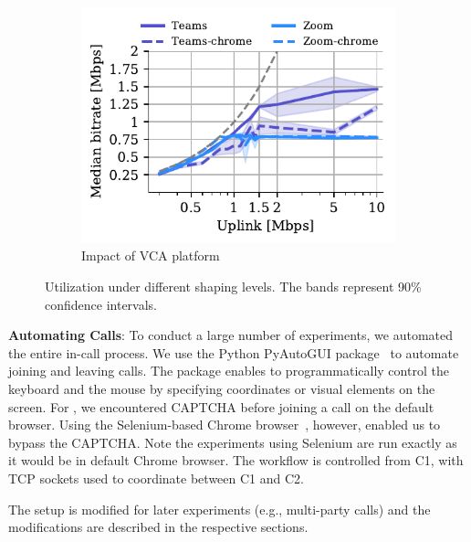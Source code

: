 \begin{figure}[ht!]
\begin{subfigure}[t]{0.33\textwidth}
\centering
    \includegraphics[width=\textwidth,keepaspectratio]{figures/static/uplink_browser.pdf}
    \caption{Impact of VCA platform %
    }
	\label{subfig:uplink_browser}
\end{subfigure} 
\caption{Utilization under different shaping levels. The bands represent 90\% confidence intervals.}
\label{fig:static}
\end{figure}

\textbf{Automating Calls}: To conduct a large number of experiments, we automated the entire in-call process. %
We use the Python PyAutoGUI package~\cite{pyautogui} to automate joining and leaving calls. The package enables to programmatically control the keyboard and the mouse by specifying coordinates or visual elements on the screen. For \zoombrowser, we encountered CAPTCHA before joining a call on the default browser. Using the Selenium-based Chrome browser~\cite{selenium}, however, enabled us to bypass the CAPTCHA. Note the experiments using Selenium are run exactly as it would be in default Chrome browser. The workflow is controlled from C1, 
  with TCP sockets used to coordinate between C1 and C2. 





The setup is modified for later experiments (e.g., multi-party calls) and the modifications are described in the respective sections.







